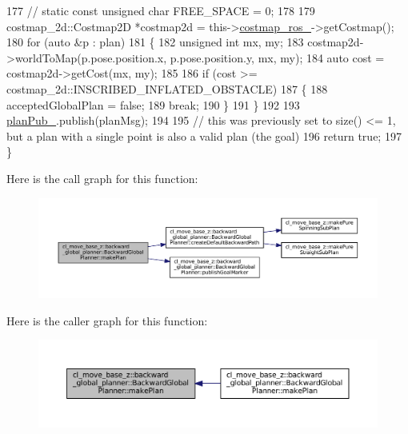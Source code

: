 \begin{DoxyCode}
177     \textcolor{comment}{// static const unsigned char FREE\_SPACE = 0;}
178 
179     costmap\_2d::Costmap2D *costmap2d = this->\hyperlink{classcl__move__base__z_1_1backward__global__planner_1_1BackwardGlobalPlanner_a7103c15e6540a514acd421c3c6e194a4}{costmap\_ros\_}->getCostmap();
180     \textcolor{keywordflow}{for} (\textcolor{keyword}{auto} &p : plan)
181     \{
182         \textcolor{keywordtype}{unsigned} \textcolor{keywordtype}{int} mx, my;
183         costmap2d->worldToMap(p.pose.position.x, p.pose.position.y, mx, my);
184         \textcolor{keyword}{auto} cost = costmap2d->getCost(mx, my);
185 
186         \textcolor{keywordflow}{if} (cost >= costmap\_2d::INSCRIBED\_INFLATED\_OBSTACLE)
187         \{
188             acceptedGlobalPlan = \textcolor{keyword}{false};
189             \textcolor{keywordflow}{break};
190         \}
191     \}
192     
193     \hyperlink{classcl__move__base__z_1_1backward__global__planner_1_1BackwardGlobalPlanner_a561eab039140948c52ec928c191f3f43}{planPub\_}.publish(planMsg);
194 
195     \textcolor{comment}{// this was previously set to size() <= 1, but a plan with a single point is also a valid plan (the
       goal)}
196     \textcolor{keywordflow}{return} \textcolor{keyword}{true};
197 \}
\end{DoxyCode}
Here is the call graph for this function\+:
\nopagebreak
\begin{figure}[H]
\begin{center}
\leavevmode
\includegraphics[width=350pt]{classcl__move__base__z_1_1backward__global__planner_1_1BackwardGlobalPlanner_a3f1f3c81e7c52c9305544fd793741a41_cgraph}
\end{center}
\end{figure}
Here is the caller graph for this function\+:
\nopagebreak
\begin{figure}[H]
\begin{center}
\leavevmode
\includegraphics[width=350pt]{classcl__move__base__z_1_1backward__global__planner_1_1BackwardGlobalPlanner_a3f1f3c81e7c52c9305544fd793741a41_icgraph}
\end{center}
\end{figure}
